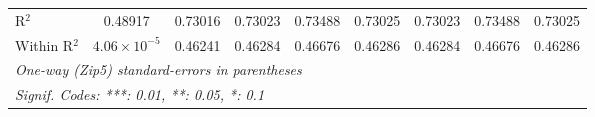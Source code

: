 \begin{table}[H]
{\begin{tabular}{lcccccccc}
 R$^2$ & 0.48917&0.73016&0.73023&0.73488&0.73025&0.73023&0.73488&0.73025\\ 

 Within R$^2$ & $4.06\times 10^{-5}$&0.46241&0.46284&0.46676&0.46286&0.46284&0.46676&0.46286\\ 

 \midrule\midrule\multicolumn{9}{l}{\emph{One-way (Zip5) standard-errors in parentheses}}\\ 

 \multicolumn{9}{l}{\emph{Signif. Codes: ***: 0.01, **: 0.05, *: 0.1}}\\ 

 \end{tabular}} 

 \end{table} 

  

